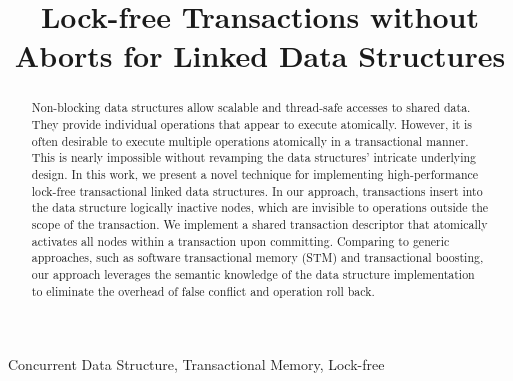 \documentclass[10pt,conference,compsocconf]{IEEEtran}
\begin{document}
\title{Lock-free Transactions without Aborts for Linked Data Structures}

\author{
}

\maketitle

\begin{abstract}
    Non-blocking data structures allow scalable and thread-safe accesses to shared data. 
    They provide individual operations that appear to execute atomically.
    However, it is often desirable to execute multiple operations atomically in a transactional manner.
    This is nearly impossible without revamping the data structures' intricate underlying design.
    In this work, we present a novel technique for implementing high-performance lock-free transactional linked data structures.
    In our approach, transactions insert into the data structure logically inactive nodes, which are invisible to operations outside the scope of the transaction.
    We implement a shared transaction descriptor that atomically activates all nodes within a transaction upon committing.
    Comparing to generic approaches, such as software transactional memory (STM) and transactional boosting, our approach leverages the semantic knowledge of the data structure implementation to eliminate the overhead of false conflict and operation roll back.
\end{abstract}

\begin{IEEEkeywords}
    Concurrent Data Structure, Transactional Memory, Lock-free 
\end{IEEEkeywords}
\end{document}
